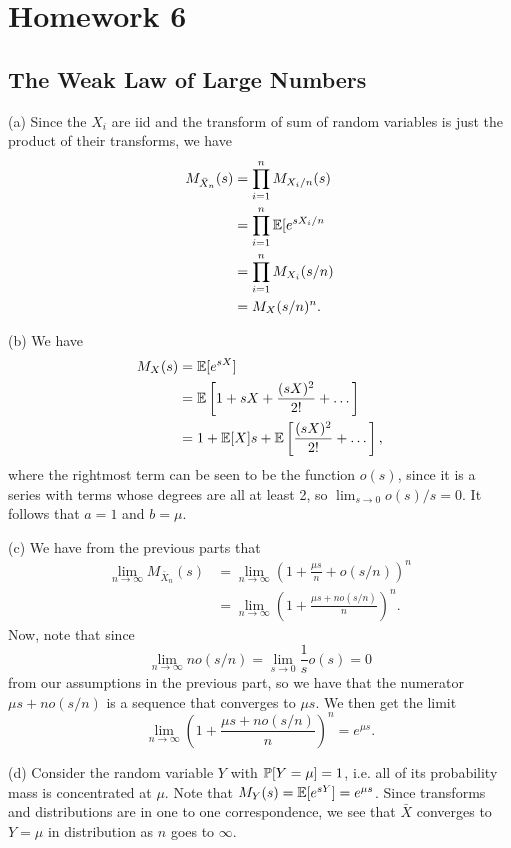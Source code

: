 \section{Homework 6}

\subsection{The Weak Law of Large Numbers}
(a) Since the $X_i$ are iid and the transform of sum of random variables is just the product of their transforms, we have
\begin{align*}
    M_{\bar{X}_n}(s) &= \prod_{i = 1}^n M_{X_i/n}(s) \\
        &= \prod_{i = 1}^n \E[e^{sX_i/n} \\
        &= \prod_{i = 1}^n M_{X_i}(s/n) \\
        &= M_{X}(s/n)^n.
\end{align*}

(b) We have
\begin{align*}
    M_X(s) &= \E[e^{sX}] \\
    &= \E\left[1 + sX + \frac{(sX)^2}{2!} + \dots\right] \\
    &= 1 + \E[X]s + \E\left[\frac{(sX)^2}{2!} + \dots\right],
\end{align*}
where the rightmost term can be seen to be the function $o(s)$, since it is a series with terms whose degrees are all at least 2, so $\lim_{s \to 0}o(s)/s = 0$. It follows that $a = 1$ and $b = \mu$.

(c) We have from the previous parts that
\begin{align*}
    \lim_{n \to \infty}M_{\bar{X}_n}(s) &= \lim_{n \to \infty}\left(1 + \frac{\mu s}{n} + o(s/n)\right)^n \\
    &= \lim_{n \to \infty}\left(1 + \frac{\mu s + no(s/n)}{n}\right)^n.
\end{align*}
Now, note that since
\[
    \lim_{n \to \infty}no(s/n) = \lim_{s \to 0}\frac{1}{s}o(s) = 0
\]
from our assumptions in the previous part, so we have that the numerator $\mu s + no(s/n)$ is a sequence that converges to $\mu s$. We then get the limit
\[
    \lim_{n \to \infty}\left(1 + \frac{\mu s + no(s/n)}{n}\right)^n = e^{\mu s}.
\]

(d) Consider the random variable $Y$ with $\P[Y = \mu] = 1$, i.e. all of its probability mass is concentrated at $\mu$. Note that $M_Y(s) = \E[e^{sY}] = e^{\mu s}$. Since transforms and distributions are in one to one correspondence, we see that $\bar{X}$ converges to $Y = \mu$ in distribution as $n$ goes to $\infty$.


